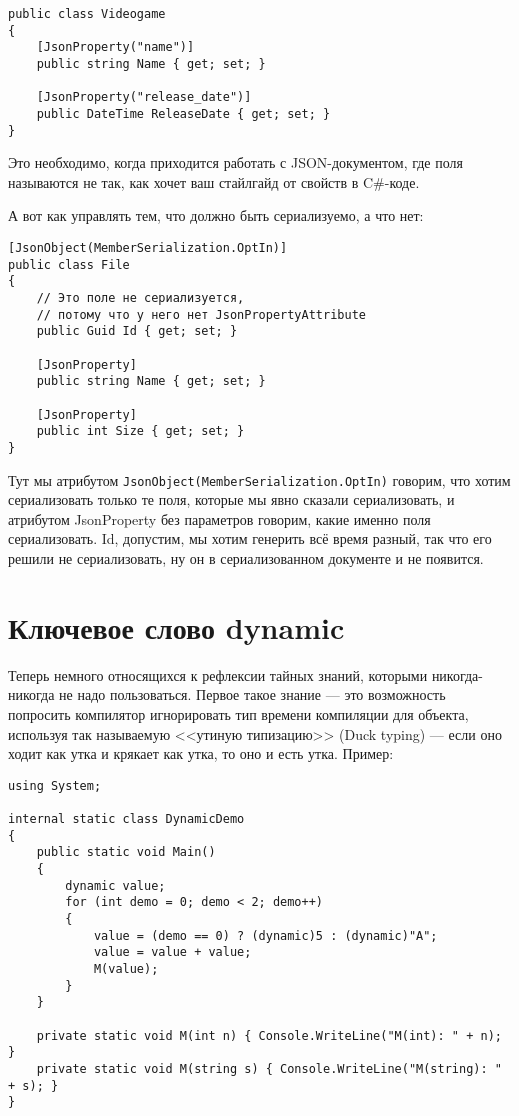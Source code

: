 \documentclass[a5paper]{article}
\begin{document}
\begin{verbatim}
public class Videogame
{
    [JsonProperty("name")]
    public string Name { get; set; }

    [JsonProperty("release_date")]
    public DateTime ReleaseDate { get; set; }
}
\end{verbatim}

Это необходимо, когда приходится работать с JSON-документом, где поля называются не так, как хочет ваш стайлгайд от свойств в C\#-коде.

А вот как управлять тем, что должно быть сериализуемо, а что нет:

\begin{verbatim}
[JsonObject(MemberSerialization.OptIn)]
public class File
{
    // Это поле не сериализуется,
    // потому что у него нет JsonPropertyAttribute
    public Guid Id { get; set; }

    [JsonProperty]
    public string Name { get; set; }

    [JsonProperty]
    public int Size { get; set; }
}
\end{verbatim}

Тут мы атрибутом \texttt{JsonObject(MemberSerialization.OptIn)} говорим, что хотим сериализовать только те поля, которые мы явно сказали сериализовать, и атрибутом JsonProperty без параметров говорим, какие именно поля сериализовать. Id, допустим, мы хотим генерить всё время разный, так что его решили не сериализовать, ну он в сериализованном документе и не появится.

\section{Ключевое слово dynamic}

Теперь немного относящихся к рефлексии тайных знаний, которыми никогда-никогда не надо пользоваться. Первое такое знание --- это возможность попросить компилятор игнорировать тип времени компиляции для объекта, используя так называемую <<утиную типизацию>> (Duck typing) --- если оно ходит как утка и крякает как утка, то оно и есть утка. Пример:

\begin{verbatim}
using System;

internal static class DynamicDemo
{
    public static void Main()
    {
        dynamic value;
        for (int demo = 0; demo < 2; demo++)
        {
            value = (demo == 0) ? (dynamic)5 : (dynamic)"A";
            value = value + value;
            M(value);
        }
    }

    private static void M(int n) { Console.WriteLine("M(int): " + n); }
    private static void M(string s) { Console.WriteLine("M(string): " + s); }
}
\end{verbatim}
\end{document}

